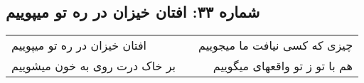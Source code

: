 \begin{center}
\section*{شماره ۳۳: افتان خیزان در ره تو میپوییم}
\label{sec:033}
\begin{longtable}{l p{0.5cm} r}
افتان خیزان در ره تو میپوییم
&&
چیزی که کسی نیافت ما میجوییم
\\
بر خاک درت روی به خون میشوییم
&&
هم با تو ز تو واقعهای میگوییم
\\
\end{longtable}
\end{center}
